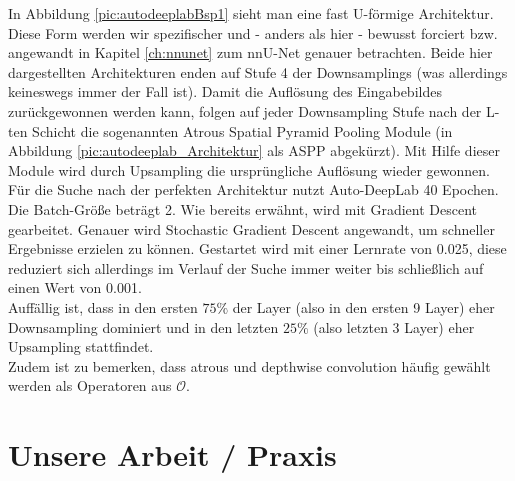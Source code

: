 In Abbildung \ref{pic:autodeeplabBsp1} sieht man eine fast U-förmige Architektur. Diese Form werden wir spezifischer und - anders als hier - bewusst forciert bzw. angewandt in Kapitel \ref{ch:nnunet} zum nnU-Net genauer betrachten. Beide hier dargestellten Architekturen enden auf Stufe 4 der Downsamplings (was allerdings keineswegs immer der Fall ist). Damit die Auflösung des Eingabebildes zurückgewonnen werden kann, folgen auf jeder Downsampling Stufe nach der L-ten Schicht die sogenannten Atrous Spatial Pyramid Pooling Module (in Abbildung \ref{pic:autodeeplab_Architektur} als ASPP abgekürzt). Mit Hilfe dieser Module wird durch Upsampling die ursprüngliche Auflösung wieder gewonnen.\\[0.3cm]
Für die Suche nach der perfekten Architektur nutzt Auto-DeepLab 40 Epochen. Die Batch-Größe beträgt 2. Wie bereits erwähnt, wird mit Gradient Descent gearbeitet. Genauer wird Stochastic Gradient Descent angewandt, um schneller Ergebnisse erzielen zu können. Gestartet wird mit einer Lernrate von 0.025, diese reduziert sich allerdings im Verlauf der Suche immer weiter bis schließlich auf einen Wert von 0.001.\\
Auffällig ist, dass in den ersten $75\%$ der Layer (also in den ersten 9 Layer) eher Downsampling dominiert und in den letzten $25\%$ (also letzten 3 Layer) eher Upsampling stattfindet.\\
Zudem ist zu bemerken, dass atrous und depthwise convolution häufig gewählt werden als Operatoren aus $\mathcal{O}$.

\section{Unsere Arbeit / Praxis}

